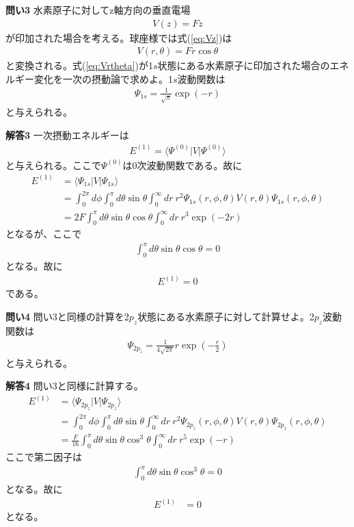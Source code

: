 \documentclass[11pt,pra,aps]{revtex4}
\begin{document}
\noindent
{\bf 問い3} 水素原子に対してz軸方向の垂直電場
\begin{align}
  V(z)=Fz \label{eq:Vz}
\end{align}
が印加された場合を考える。球座様では式(\ref{eq:Vz})は
\begin{align}
  V(r,\theta)=Fr\cos\theta \label{eq:Vrtheta}
\end{align}
と変換される。式(\ref{eq:Vrtheta})が1$s$状態にある水素原子に印加された場合のエネルギー変化を一次の摂動論で求めよ。1$s$波動関数は
\begin{align}
  \Psi_{1s}=\frac{1}{\sqrt{\pi}} \exp(-r)
\end{align}
と与えられる。

\noindent
{\bf 解答3}
一次摂動エネルギーは
\begin{align}
  E^{(1)}=\langle\Psi^{(0)}|V|\Psi^{(0)}\rangle
\end{align}
と与えられる。ここで$\Psi^{(0)}$は0次波動関数である。故に
\begin{align}
  E^{(1)}&=\langle\Psi_{1s}|V|\Psi_{1s}\rangle \nonumber \\
  &=\int_0^{2\pi}d\phi\int_0^\pi d\theta\sin\theta\int_0^\infty dr \ r^2 \Psi_{1s}(r,\phi,\theta) V(r,\theta) \Psi_{1s}(r,\phi,\theta) \nonumber \\
  &=2 F \int_0^\pi d\theta\sin\theta\cos\theta\int_0^\infty dr \ r^3 \exp(-2r) 
\end{align}
となるが、ここで
\begin{align}
  \int_0^\pi d\theta\sin\theta\cos\theta = 0
\end{align}
となる。故に
\begin{align}
E^{(1)}=0
\end{align}
である。

\noindent
{\bf 問い4} 問い3と同様の計算を2$p_z$状態にある水素原子に対して計算せよ。2$p_z$波動関数は
\begin{align}
  \Psi_{2p_z}=\frac{1}{4\sqrt{2\pi}} r \exp(-\frac{r}{2})
\end{align}
と与えられる。

\noindent
{\bf 解答4}
問い3と同様に計算する。
\begin{align}
  E^{(1)}&=\langle\Psi_{2p_z}|V|\Psi_{2p_z}\rangle \nonumber \\
  &=\int_0^{2\pi}d\phi\int_0^\pi d\theta\sin\theta\int_0^\infty dr \ r^2 \Psi_{2p_z}(r,\phi,\theta) V(r,\theta) \Psi_{2p_z}(r,\phi,\theta) \nonumber \\
  &=\frac{F}{16} \int_0^\pi d\theta\sin\theta\cos^3\theta\int_0^\infty dr \ r^5 \exp(-r) 
\end{align}
ここで第二因子は
\begin{align}
  \int_0^\pi d\theta\sin\theta\cos^3\theta = 0
\end{align}
となる。故に
\begin{align}
  E^{(1)}&=0
\end{align}
となる。
\end{document}
